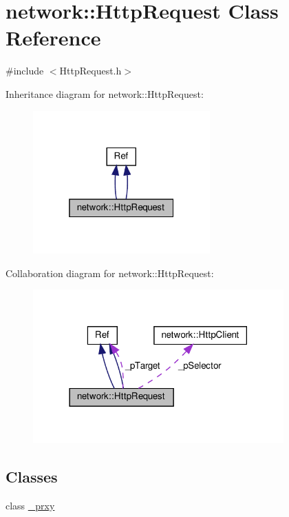 \hypertarget{classnetwork_1_1HttpRequest}{}\section{network\+:\+:Http\+Request Class Reference}
\label{classnetwork_1_1HttpRequest}


{\ttfamily \#include $<$Http\+Request.\+h$>$}



Inheritance diagram for network\+:\+:Http\+Request\+:
\nopagebreak
\begin{figure}[H]
\begin{center}
\leavevmode
\includegraphics[width=193pt]{classnetwork_1_1HttpRequest__inherit__graph}
\end{center}
\end{figure}


Collaboration diagram for network\+:\+:Http\+Request\+:
\nopagebreak
\begin{figure}[H]
\begin{center}
\leavevmode
\includegraphics[width=273pt]{classnetwork_1_1HttpRequest__coll__graph}
\end{center}
\end{figure}
\subsection*{Classes}
\begin{DoxyCompactItemize}
\item 
class \hyperlink{classnetwork_1_1HttpRequest_1_1__prxy}{\+\_\+prxy}
\end{DoxyCompactItemize}
